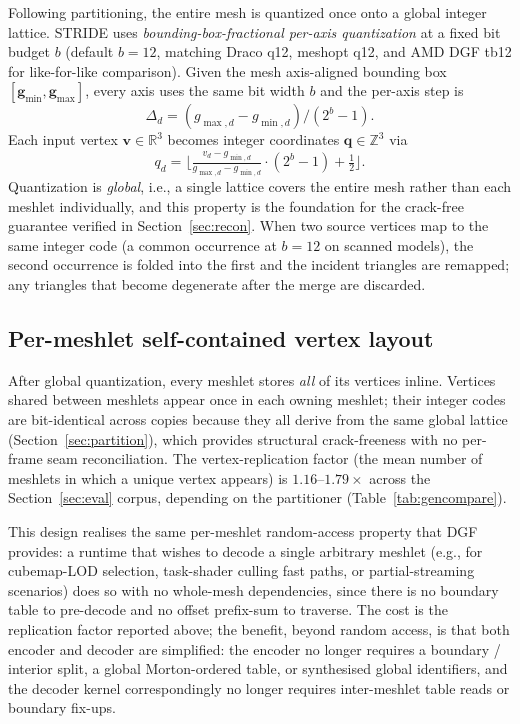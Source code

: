 \documentclass[pdflatex,sn-vancouver-num]{sn-jnl}%
\theoremstyle{thmstyleone}%
\theoremstyle{thmstyletwo}%
\theoremstyle{thmstylethree}%
\begin{document}
Following partitioning, the entire mesh is quantized once onto a global integer lattice. STRIDE uses \emph{bounding-box-fractional per-axis quantization} at a fixed bit budget $b$ (default $b = 12$, matching Draco q12, meshopt q12, and AMD DGF tb12 for like-for-like comparison). Given the mesh axis-aligned bounding box $[\mathbf{g}_{\min}, \mathbf{g}_{\max}]$, every axis uses the same bit width $b$ and the per-axis step is
\begin{equation}
\Delta_d = (g_{\max,d} - g_{\min,d}) / (2^b - 1).
\label{eq:step}
\end{equation}
Each input vertex $\mathbf{v} \in \mathbb{R}^3$ becomes integer coordinates $\mathbf{q} \in \mathbb{Z}^3$ via
\begin{equation}
q_d = \Big\lfloor \tfrac{v_d - g_{\min,d}}{g_{\max,d} - g_{\min,d}} \cdot (2^{b} - 1) + \tfrac{1}{2} \Big\rfloor.
\label{eq:quant}
\end{equation}
Quantization is \emph{global}, i.e., a single lattice covers the entire mesh rather than each meshlet individually, and this property is the foundation for the crack-free guarantee verified in Section~\ref{sec:recon}. When two source vertices map to the same integer code (a common occurrence at $b = 12$ on scanned models), the second occurrence is folded into the first and the incident triangles are remapped; any triangles that become degenerate after the merge are discarded.

\subsection{Per-meshlet self-contained vertex layout}\label{sec:selfcontained}

After global quantization, every meshlet stores \emph{all} of its vertices inline. Vertices shared between meshlets appear once in each owning meshlet; their integer codes are bit-identical across copies because they all derive from the same global lattice (Section~\ref{sec:partition}), which provides structural crack-freeness with no per-frame seam reconciliation. The vertex-replication factor (the mean number of meshlets in which a unique vertex appears) is $1.16$--$1.79\times$ across the Section~\ref{sec:eval} corpus, depending on the partitioner (Table~\ref{tab:gencompare}).

This design realises the same per-meshlet random-access property that DGF provides: a runtime that wishes to decode a single arbitrary meshlet (e.g., for cubemap-LOD selection, task-shader culling fast paths, or partial-streaming scenarios) does so with no whole-mesh dependencies, since there is no boundary table to pre-decode and no offset prefix-sum to traverse. The cost is the replication factor reported above; the benefit, beyond random access, is that both encoder and decoder are simplified: the encoder no longer requires a boundary / interior split, a global Morton-ordered table, or synthesised global identifiers, and the decoder kernel correspondingly no longer requires inter-meshlet table reads or boundary fix-ups.
\end{document}
